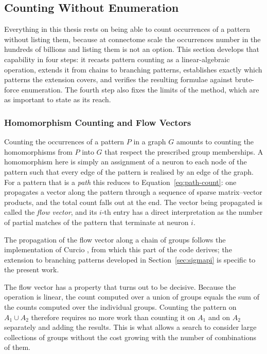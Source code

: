 \documentclass[12pt,a4paper,oneside]{article}
\theoremstyle{definition}
\theoremstyle{plain}
\begin{document}
\subsection{Counting Without Enumeration}
\label{sec:counting}


Everything in this thesis rests on being able to count occurrences of a
pattern without listing them, because at connectome scale the occurrences
number in the hundreds of billions and listing them is not an option. This
section develops that capability in four steps: it recasts pattern counting
as a linear-algebraic operation, extends it from chains to branching
patterns, establishes exactly which patterns the extension covers, and
verifies the resulting formulae against brute-force enumeration. The fourth
step also fixes the limits of the method, which are as important to state as
its reach.

\subsubsection{Homomorphism Counting and Flow Vectors}

Counting the occurrences of a pattern $P$ in a graph $G$ amounts to counting
the homomorphisms from $P$ into $G$ that respect the prescribed group
memberships. A homomorphism here is simply an assignment of a neuron to each
node of the pattern such that every edge of the pattern is realised by an
edge of the graph. For a pattern that is a \emph{path} this reduces to
Equation~\eqref{eq:path-count}: one propagates a vector along the pattern
through a sequence of sparse matrix--vector products, and the total count
falls out at the end. The vector being propagated is called the \emph{flow
vector}, and its $i$-th entry has a direct interpretation as the number of
partial matches of the pattern that terminate at neuron $i$.

The propagation of the flow vector along a chain of groups follows the
implementation of Curcio \cite{curcio2026}, from which this part of the code
derives; the extension to branching patterns developed in
Section~\ref{sec:sigmapi} is specific to the present work.

The flow vector has a property that turns out to be decisive. Because the
operation is linear, the count computed over a union of groups equals the
sum of the counts computed over the individual groups. Counting the pattern
on $A_1 \cup A_2$ therefore requires no more work than counting it on $A_1$
and on $A_2$ separately and adding the results. This is what allows a search
to consider large collections of groups without the cost growing with the
number of combinations of them.
\end{document}
